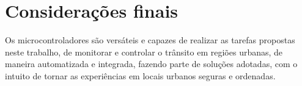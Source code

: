 \chapter{Considerações finais}

Os microcontroladores são versáteis e capazes de realizar as tarefas propostas neste trabalho, de monitorar e controlar o trânsito em regiões urbanas, de maneira automatizada e integrada, fazendo parte de soluções adotadas, com o intuito de tornar as experiências em locais urbanos seguras e ordenadas.
